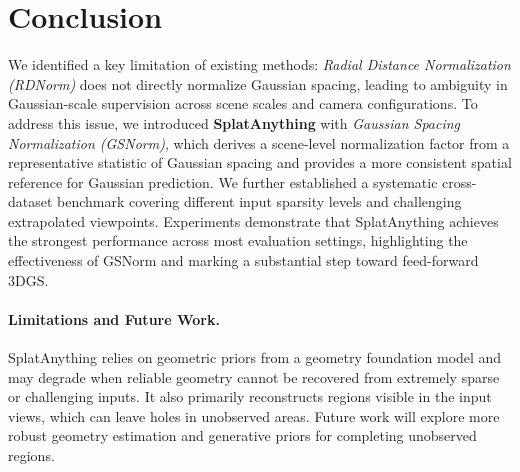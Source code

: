 
\section{Conclusion}

\label{sec:conclusion}
We identified a key limitation of existing methods: \emph{Radial Distance
Normalization (RDNorm)} does not directly normalize Gaussian spacing,
leading to ambiguity in Gaussian-scale supervision across scene scales and
camera configurations. To address this issue, we introduced
\textbf{SplatAnything} with \textit{Gaussian Spacing Normalization (GSNorm)},
which derives a scene-level normalization factor from a representative
statistic of Gaussian spacing and provides a more consistent spatial
reference for Gaussian prediction. We further established a systematic
cross-dataset benchmark covering different input sparsity levels and
challenging extrapolated viewpoints. Experiments demonstrate that
SplatAnything achieves the strongest performance across most evaluation
settings, highlighting the effectiveness of GSNorm and marking a
substantial step toward feed-forward 3DGS.

\paragraph{Limitations and Future Work.}
SplatAnything relies on geometric priors from a geometry foundation model
and may degrade when reliable geometry cannot be recovered from extremely
sparse or challenging inputs. It also primarily reconstructs regions
visible in the input views, which can leave holes in unobserved areas.
Future work will explore more robust geometry estimation and generative
priors for completing unobserved regions.